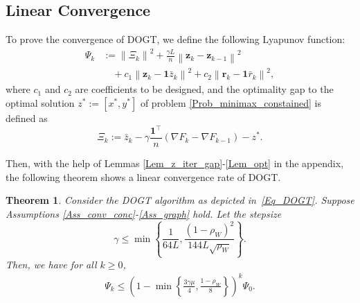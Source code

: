 \documentclass[letterpaper, 10 pt, conference]{ieeeconf}
\newtheorem{Thm}{Theorem}
\begin{document}
\subsection{Linear Convergence}

To prove the convergence of DOGT, we define the following Lyapunov function:
\begin{equation}
\begin{aligned}
\varPsi _k&:=\left\| \varXi _k \right\| ^2+\frac{\gamma L}{n}\left\| \mathbf{z}_k-\mathbf{z}_{k-1} \right\| ^2
\\
&\quad+c_1\left\| \mathbf{z}_k-\mathbf{1}\bar{z}_k \right\| ^2+c_2\left\| \mathbf{r}_k-\mathbf{1}\bar{r}_k \right\| ^2,
\end{aligned}
\end{equation}
where $c_1$ and $c_2$ are coefficients to be designed, and the optimality gap to the optimal solution $z^*:=\left[ x^*,y^* \right]$ of problem \eqref{Prob_minimax_constained} is defined as
\begin{equation}\label{Eq_opt_gap}
\varXi _k:=\bar{z}_k-\gamma \frac{\mathbf{1}^{\top}}{n}\left( \nabla F_k-\nabla F_{k-1} \right) -z^*.
\end{equation}

Then, with the help of Lemmas \ref{Lem_z_iter_gap}-\ref{Lem_opt} in the appendix, the following theorem shows a linear convergence rate of DOGT.

\begin{Thm}\label{Thm_DOGT}
{Consider the DOGT algorithm as depicted in~\eqref{Eq_DOGT}.} Suppose Assumptions \ref{Ass_conv_conc}-\ref{Ass_graph} hold. Let the stepsize 
\begin{equation}\label{ss_theorem}
\gamma \leqslant \min \left\{ \frac{1}{64L}, \frac{\left( 1-\rho _W \right) ^2}{144L\sqrt{\rho _W}} \right\}.
\end{equation}
Then, we have for all $k \geqslant 0$,
\begin{equation}
\begin{aligned}
\varPsi _k\leqslant \left( 1-\min \left\{ \frac{3\gamma \mu}{4}, \frac{1-\rho _W}{8} \right\} \right) ^k\varPsi _0.
\end{aligned}
\end{equation}
\end{Thm}
\end{document}
